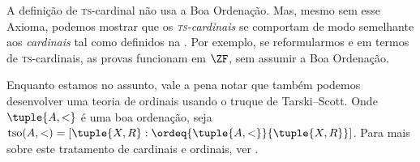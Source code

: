 \documentclass[../../../include/open-logic-section]{subfiles}
\begin{document}
A definição de \textsc{ts}-cardinal não usa a Boa Ordenação.
Mas, mesmo sem esse Axioma, podemos mostrar que os
\emph{\textsc{ts}-cardinais} se comportam de modo semelhante aos \emph{cardinais} tal como
definidos na .
Por exemplo, se reformularmos
 e
 em termos de
\textsc{ts}-cardinais, as provas funcionam em $\ZF$,
sem assumir a Boa Ordenação. 

Enquanto estamos no assunto, vale a pena notar que também podemos
desenvolver uma teoria de ordinais usando o truque de Tarski--Scott. Onde
$\tuple{A, <}$ é uma boa ordenação, seja $\text{tso}(A, <) = [\tuple{X,
R} : \ordeq{\tuple{A, <}}{\tuple{X, R}}]$. Para mais sobre este tratamento
de cardinais e ordinais, ver \citet[chs.~9--12]{Potter2004}.
\end{document}
